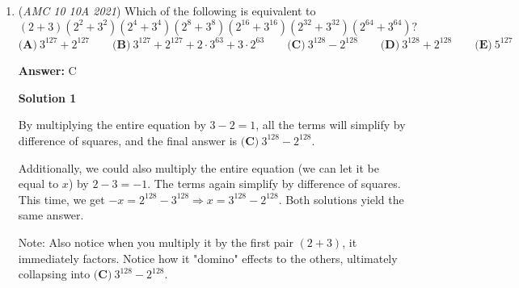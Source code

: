 \begin{enumerate}
\textbf{Solution 3 (Beyond Overkill )}

Like solution 1, expand and simplify the original equation to $x^2+y^2+x^2y^2+1$ and let $f(x, y) = x^2+y^2+x^2y^2+1$. To find local extrema, find where $\nabla f(x, y) = \boldsymbol{0}$. First, find the first partial derivative with respect to x and y and find where they are $0$:
 \[\frac{\partial f}{\partial x} = 2x + 2xy^{2} = 2x(1 + y^{2}) = 0 \implies x = 0\]
 \[\frac{\partial f}{\partial y} = 2y + 2yx^{2} = 2y(1 + x^{2}) = 0 \implies y = 0\]Thus, there is a local extremum at $(0, 0)$. Because this is the only extremum, we can assume that this is a minimum because the problem asks for the minimum (though this can also be proven using the partial second derivative test) and the global minimum since it's the only minimum, meaning $f(0, 0)$ is the minimum of $f(x, y)$. Plugging $(0, 0)$ into $f(x, y)$, we find 1 $\implies \boxed{\textbf{(D)} ~1}$.

 Remark:Honestly, this isn't even that overkill. I did it this way, and it was not very bashy.~vaishnav

 Note: the problem where this is linked is covered 0:21-0:50

 


	\item (\textit{AMC 10 10A 2021}) Which of the following is equivalent to 
 \[(2+3)(2^2+3^2)(2^4+3^4)(2^8+3^8)(2^{16}+3^{16})(2^{32}+3^{32})(2^{64}+3^{64})?\]
$\textbf{(A)} ~3^{127} + 2^{127} \qquad\textbf{(B)} ~3^{127} + 2^{127} + 2 \cdot 3^{63} + 3 \cdot 2^{63} \qquad\textbf{(C)} ~3^{128}-2^{128} \qquad\textbf{(D)} ~3^{128} + 2^{128} \qquad\textbf{(E)} ~5^{127}$

 \textbf{Answer: }C



\textbf{Solution 1}

By multiplying the entire equation by $3-2=1$, all the terms will simplify by difference of squares, and the final answer is $\boxed{\textbf{(C)} ~3^{128}-2^{128}}$.

 Additionally, we could also multiply the entire equation (we can let it be equal to $x$) by $2-3=-1$. The terms again simplify by difference of squares. This time, we get $-x=2^{128}-3^{128} \Rightarrow x=3^{128}-2^{128}$. Both solutions yield the same answer.

 Note: Also notice when you multiply it by the first pair $(2+3)$, it immediately factors. Notice how it "domino" effects to the others, ultimately collapsing into $\boxed{\textbf{(C)} ~3^{128}-2^{128}}$.


\end{enumerate}
